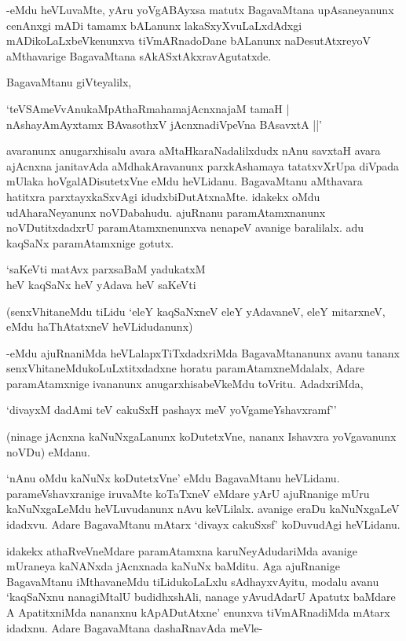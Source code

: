 -eMdu heVLuvaMte, yAru yoVgABAyxsa matutx BagavaMtana upAsaneyanunx cenAnxgi mADi tamamx bALanunx lakaSxyXvuLaLxdAdxgi mADikoLaLxbeVkenunxva tiVmARnadoDane bALanunx naDesutAtxreyoV aMthavarige BagavaMtana sAkASxtAkxravAgutatxde.

BagavaMtanu giVteyalilx,

\begin{shloka}
`teVSAmeVvAnukaMpAthaRmahamajAcnxnajaM tamaH |\\
nAshayAmAyxtamx BAvasothxV jAcnxnadiVpeVna BAsavxtA ||'
\end{shloka}

avaranunx anugarxhisalu avara aMtaHkaraNadalilxdudx nAnu savxtaH avara ajAcnxna janitavAda aMdhakAravanunx parxkAshamaya tatatxvXrUpa diVpada mUlaka hoVgalADisutetxVne eMdu heVLidanu. BagavaMtanu aMthavara hatitxra parxtayxkaSxvAgi idudxbiDutAtxnaMte. idakekx oMdu udAharaNeyanunx noVDabahudu. ajuRnanu paramAtamxnanunx noVDutitxdadxrU paramAtamxnenunxva nenapeV avanige baralilalx. adu kaqSaNx paramAtamxnige gotutx.

\begin{shloka}
`saKeVti matAvx parxsaBaM yadukatxM\\
heV kaqSaNx heV yAdava heV saKeVti
\end{shloka}

(senxVhitaneMdu tiLidu `eleY kaqSaNxneV eleY yAdavaneV, eleY mitarxneV, eMdu haThAtatxneV heVLidudanunx)

-eMdu ajuRnaniMda heVLalapxTiTxdadxriMda BagavaMtananunx avanu tananx senxVhitaneMdukoLuLxtitxdadxne horatu paramAtamxneMdalalx, Adare paramAtamxnige ivananunx anugarxhisabeVkeMdu toVritu. AdadxriMda,

\begin{shloka}
`divayxM dadAmi teV cakuSxH pashayx meV yoVgameYshavxramf''
\end{shloka}

(ninage jAcnxna kaNuNxgaLanunx koDutetxVne, nananx Ishavxra yoVgavanunx noVDu) eMdanu.

`nAnu oMdu kaNuNx koDutetxVne' eMdu BagavaMtanu heVLidanu. parameVshavxranige iruvaMte koTaTxneV eMdare yArU ajuRnanige mUru kaNuNxgaLeMdu heVLuvudanunx nAvu keVLilalx. avanige eraDu kaNuNxgaLeV idadxvu. Adare BagavaMtanu mAtarx `divayx cakuSxsf' koDuvudAgi heVLidanu.

idakekx athaRveVneMdare paramAtamxna karuNeyAdudariMda avanige mUraneya kaNANxda jAcnxnada kaNuNx baMditu. Aga ajuRnanige BagavaMtanu iMthavaneMdu tiLidukoLaLxlu sAdhayxvAyitu, modalu avanu `kaqSaNxnu nanagiMtalU budidhxshAli, nanage yAvudAdarU Apatutx baMdare A ApatitxniMda nananxnu kApADutAtxne' enunxva tiVmARnadiMda mAtarx idadxnu. Adare BagavaMtana dashaRnavAda meVle-

